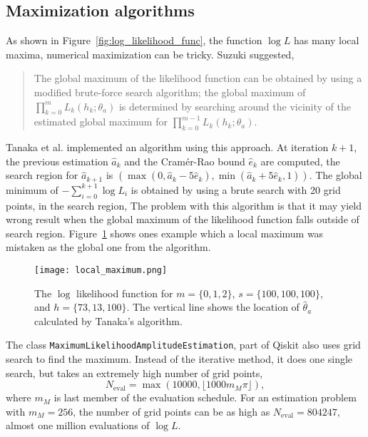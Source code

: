 \documentclass{article}
\begin{document}
\subsection{Maximization algorithms}
As shown in Figure~\ref{fig:log_likelihood_func}, the function $\log L$ has
many local maxima, numerical maximization can be tricky.
Suzuki\cite{suzuki_2020} suggested,
\begin{quote}
  The global maximum of the likelihood function can be obtained by
using a modified brute-force search algorithm; the global maximum of
$\prod_{k=0}^mL_k(h_k; \theta_a)$ is determined by searching around the
vicinity of the estimated global maximum for
$\prod_{k=0}^{m-1}L_k(h_k; \theta_a)$.
\end{quote}
Tanaka et al.\cite{qiskit_aewoqft} implemented an algorithm using
this approach.  At iteration $k+1$, the previous estimation $\hat a_k$
and the Cram\'er-Rao bound $\hat e_k$ are computed, the search region
for $\hat a_{k+1}$ is
$(\max(0, \hat a_k-5\hat e_k), \min(\hat a_k+5\hat e_k, 1))$.
The global minimum of $-\sum_{i=0}^{k+1}\log L_i$ is obtained by
using a brute search with 20 grid points, in the search region,
The problem with this algorithm is that it may yield wrong result
when the global maximum of the likelihood function falls outside of
search region.  Figure~\ref{fig:local_maximum}
shows ones example which a local maximum was mistaken as the global one
from the algorithm.

\begin{figure}
  \begin{center}
    \texttt{[image: local\_maximum.png]}
  \end{center}
  \caption{The $\log$ likelihood function for $m = \{0, 1, 2\}$,
    $s = \{100, 100, 100\}$, and $h = \{73, 13, 100\}$.  The vertical
    line shows the location of $\hat\theta_a$ calculated by Tanaka's
    algorithm.} 
  \label{fig:local_maximum}
\end{figure}

The class \texttt{MaximumLikelihoodAmplitudeEstimation}\cite{qiskit_mlae},
part of Qiskit\cite{qiskit} also uses grid search to find the maximum.
Instead of the iterative method, it does one single search, but takes an
extremely high number of grid points, 
\begin{equation}
N_{\text{eval}} = \max(10000, \lfloor1000m_M\pi\rfloor),
\end{equation}
where $m_M$ is last member of the evaluation schedule.  For an
estimation problem with $m_M = 256$, the number of grid points
can be as high as $N_{\text{eval}} = 804247$, almost one million
evaluations of $\log L$.
\end{document}
